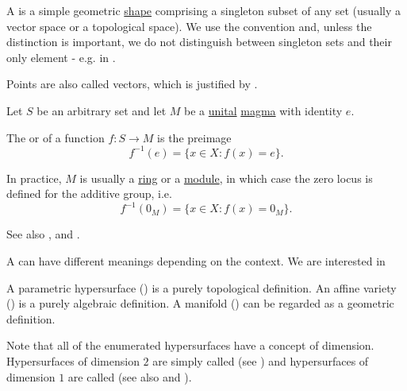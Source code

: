 \begin{definition}\label{def:point}
  A  is a simple geometric \hyperref[def:geometric_shape]{shape} comprising a singleton subset of any set (usually a vector space or a topological space). We use the convention  and, unless the distinction is important, we do not distinguish between singleton sets and their only element - e.g. in .

  Points are also called vectors, which is justified by .
\end{definition}

\begin{definition}\label{def:zero_locus}
  Let \( S \) be an arbitrary set and let \( M \) be a \hyperref[def:algebraic_theory/identity]{unital} \hyperref[def:magma/magma]{magma} with identity \( e \).

  The  or  of a function \( f: S \to M \) is the preimage
  \begin{equation*}
    f^{-1}(e) = \{ x \in X \colon f(x) = e \}.
  \end{equation*}

  In practice, \( M \) is usually a \hyperref[def:semiring/ring]{ring} or a \hyperref[def:left_module]{module}, in which case the zero locus is defined for the additive group, i.e.
  \begin{equation*}
    f^{-1}(0_M) = \{ x \in X \colon f(x) = 0_M \}.
  \end{equation*}

  See also ,  and .
\end{definition}

\begin{definition}\label{def:hypersurface}
  A  can have different meanings depending on the context. We are interested in

  \begin{DefEnum}
     A parametric hypersurface () is a purely topological definition.
     An affine variety () is a purely algebraic definition.
     A manifold () can be regarded as a geometric definition.
  \end{DefEnum}

  Note that all of the enumerated hypersurfaces have a concept of dimension. Hypersurfaces of dimension \( 2 \) are simply called  (see ) and hypersurfaces of dimension \( 1 \) are called  (see also  and ).
\end{definition}

